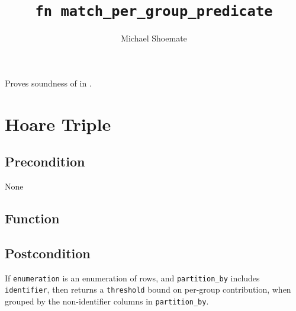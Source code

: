 \documentclass{article}
\title{\texttt{fn match\_per\_group\_predicate}}
\author{Michael Shoemate}
\begin{document}
\maketitle  


\contrib

Proves soundness of  
in .

\section{Hoare Triple}
\subsection*{Precondition}
None 

\subsection*{Function}
\label{sec:python-pseudocode}


\subsection*{Postcondition}
\begin{theorem}[Postcondition]
    If \texttt{enumeration} is an enumeration of rows,
    and \texttt{partition\_by} includes \texttt{identifier},
    then returns a \texttt{threshold} bound on per-group contribution,
    when grouped by the non-identifier columns in \texttt{partition\_by}.
\end{theorem}
\end{document}
